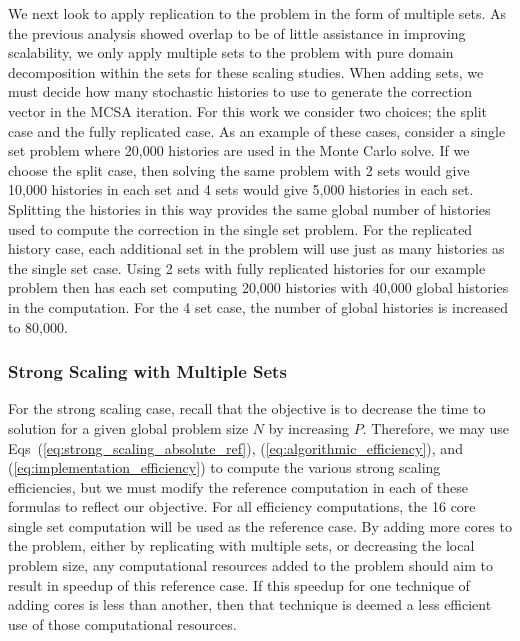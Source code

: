 We next look to apply replication to the problem in the form of
multiple sets. As the previous analysis showed overlap to be of little
assistance in improving scalability, we only apply multiple sets to
the problem with pure domain decomposition within the sets for these
scaling studies. When adding sets, we must decide how many stochastic
histories to use to generate the correction vector in the MCSA
iteration. For this work we consider two choices; the split case and
the fully replicated case. As an example of these cases, consider a
single set problem where 20,000 histories are used in the Monte Carlo
solve. If we choose the split case, then solving the same problem with
2 sets would give 10,000 histories in each set and 4 sets would give
5,000 histories in each set. Splitting the histories in this way
provides the same global number of histories used to compute the
correction in the single set problem. For the replicated history case,
each additional set in the problem will use just as many histories as
the single set case. Using 2 sets with fully replicated histories for
our example problem then has each set computing 20,000 histories with
40,000 global histories in the computation. For the 4 set case, the
number of global histories is increased to 80,000.

\subsubsection{Strong Scaling with Multiple Sets}
\label{subsubsec:ms_strong}

For the strong scaling case, recall that the objective is to decrease
the time to solution for a given global problem size $N$ by increasing
$P$. Therefore, we may use Eqs~(\ref{eq:strong_scaling_absolute_ref}),
(\ref{eq:algorithmic_efficiency}), and
(\ref{eq:implementation_efficiency}) to compute the various strong
scaling efficiencies, but we must modify the reference computation in
each of these formulas to reflect our objective. For all efficiency
computations, the 16 core single set computation will be used as the
reference case. By adding more cores to the problem, either by
replicating with multiple sets, or decreasing the local problem size,
any computational resources added to the problem should aim to result
in speedup of this reference case. If this speedup for one technique
of adding cores is less than another, then that technique is deemed a
less efficient use of those computational resources.

